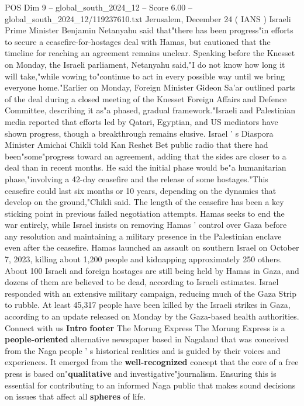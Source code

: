 \begin{textsample}{POS Dim 9 – global\_south\_2024\_12 – Score 6.00 – global\_south\_2024\_12/119237610.txt}  \label{ex:f9_pos_326}
Jerusalem, December 24 ( IANS ) Israeli Prime Minister Benjamin Netanyahu said that"there has been progress"in efforts to secure a ceasefire-for-hostages deal with Hamas, but cautioned that the timeline for reaching an agreement remains unclear.
Speaking before the Knesset on Monday, the Israeli parliament, Netanyahu said,"I do not know how long it will take,"while vowing to"continue to act in every possible way until we bring everyone home."Earlier on Monday, Foreign Minister Gideon Sa'ar outlined parts of the deal during a closed meeting of the Knesset Foreign Affairs and Defence Committee, describing it as"a phased, gradual framework."Israeli and Palestinian media reported that efforts led by Qatari, Egyptian, and US mediators have shown progress, though a breakthrough remains elusive.
Israel ' s Diaspora Minister Amichai Chikli told Kan Reshet Bet public radio that there had been"some"progress toward an agreement, adding that the sides are closer to a deal than in recent months.
He said the initial phase would be"a humanitarian phase,"involving a 42-day ceasefire and the release of some hostages."This ceasefire could last six months or 10 years, depending on the dynamics that develop on the ground,"Chikli said.
The length of the ceasefire has been a key sticking point in previous failed negotiation attempts.
Hamas seeks to end the war entirely, while Israel insists on removing Hamas ' control over Gaza before any resolution and maintaining a military presence in the Palestinian enclave even after the ceasefire.
Hamas launched an assault on southern Israel on October 7, 2023, killing about 1,200 people and kidnapping approximately 250 others.
About 100 Israeli and foreign hostages are still being held by Hamas in Gaza, and dozens of them are believed to be dead, according to Israeli estimates.
Israel responded with an extensive military campaign, reducing much of the Gaza Strip to rubble.
At least 45,317 people have been killed by the Israeli strikes in Gaza, according to an update released on Monday by the Gaza-based health authorities.
Connect with us \textbf{Intro} \textbf{footer} The Morung Express The Morung Express is a \textbf{people-oriented} alternative newspaper based in Nagaland that was conceived from the Naga people ' s historical realities and is guided by their voices and experiences.
It emerged from the \textbf{well-recognized} concept that the core of a free press is based on"\textbf{qualitative} and investigative"journalism.
Ensuring this is essential for contributing to an informed Naga public that makes sound decisions on issues that affect all \textbf{spheres} of life.

\end{textsample}
